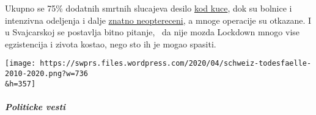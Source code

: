 Ukupno se 75\% dodatnih smrtnih slucajeva desilo
\href{https://www.tagesspiegel.de/wissen/woran-sterben-corona-patienten-wirklich-ein-schweizer-forscher-macht-hoffnung-im-kampf-gegen-covid-19/25750666.html}{kod
kuce}, dok su bolnice i intenzivna odeljenja i dalje
\href{https://swprs.files.wordpress.com/2020/04/intensivbettenbelegung-schweiz-2020-04-14.png}{znatno
neoptereceni}, a mnoge operacije su otkazane. I u Svajcarskoj se
postavlja bitno pitanje, ~da nije mozda Lockdown mnogo vise egzistencija
i zivota kostao, nego sto ih je mogao spasiti.

\texttt{[image: https://swprs.files.wordpress.com/2020/04/schweiz-todesfaelle-2010-2020.png?w=736\\\&h=357]}

\hypertarget{politicke-vesti}{%
\subparagraph{\texorpdfstring{\textbf{Politicke
vesti}}{Politicke vesti}}\label{politicke-vesti}}

